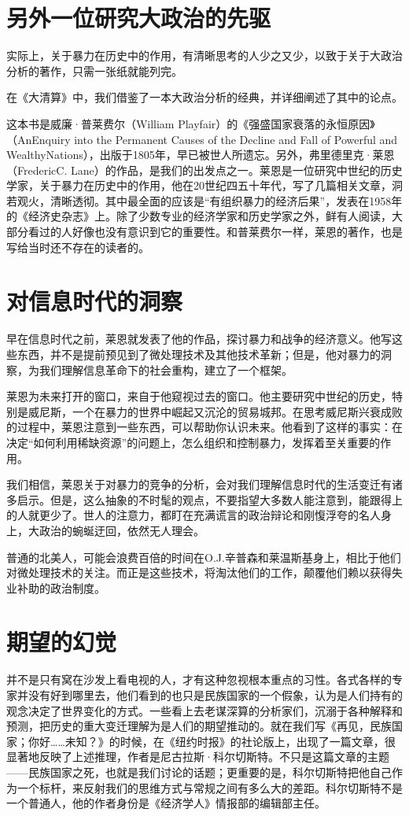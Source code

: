 \section{另外一位研究大政治的先驱}
实际上，关于暴力在历史中的作用，有清晰思考的人少之又少，以致于关于大政治分析的著作，只需一张纸就能列完。


在《大清算》中，我们借鉴了一本大政治分析的经典，并详细阐述了其中的论点。


这本书是威廉·普莱费尔（William Playfair）的《强盛国家衰落的永恒原因》（AnEnquiry into the Permanent Causes of the Decline and Fall of Powerful and WealthyNations），出版于1805年，早已被世人所遗忘。另外，弗里德里克·莱恩（FredericC. Lane）的作品，是我们的出发点之一。莱恩是一位研究中世纪的历史学家，关于暴力在历史中的作用，他在20世纪四五十年代，写了几篇相关文章，洞若观火，清晰透彻。其中最全面的应该是“有组织暴力的经济后果”，发表在1958年的《经济史杂志》上。除了少数专业的经济学家和历史学家之外，鲜有人阅读，大部分看过的人好像也没有意识到它的重要性。和普莱费尔一样，莱恩的著作，也是写给当时还不存在的读者的。


\section{对信息时代的洞察}
早在信息时代之前，莱恩就发表了他的作品，探讨暴力和战争的经济意义。他写这些东西，并不是提前预见到了微处理技术及其他技术革新；但是，他对暴力的洞察，为我们理解信息革命下的社会重构，建立了一个框架。


莱恩为未来打开的窗口，来自于他窥视过去的窗口。他主要研究中世纪的历史，特别是威尼斯，一个在暴力的世界中崛起又沉沦的贸易城邦。在思考威尼斯兴衰成败的过程中，莱恩注意到一些东西，可以帮助你认识未来。他看到了这样的事实：在决定“如何利用稀缺资源”的问题上，怎么组织和控制暴力，发挥着至关重要的作用。


我们相信，莱恩关于对暴力的竞争的分析，会对我们理解信息时代的生活变迁有诸多启示。但是，这么抽象的不时髦的观点，不要指望大多数人能注意到，能跟得上的人就更少了。世人的注意力，都盯在充满谎言的政治辩论和刚愎浮夸的名人身上，大政治的蜿蜒迂回，依然无人理会。


普通的北美人，可能会浪费百倍的时间在O.J.辛普森和莱温斯基身上，相比于他们对微处理技术的关注。而正是这些技术，将淘汰他们的工作，颠覆他们赖以获得失业补助的政治制度。


\section{期望的幻觉}
并不是只有窝在沙发上看电视的人，才有这种忽视根本重点的习性。各式各样的专家并没有好到哪里去，他们看到的也只是民族国家的一个假象，认为是人们持有的观念决定了世界变化的方式。一些看上去老谋深算的分析家们，沉溺于各种解释和预测，把历史的重大变迁理解为是人们的期望推动的。就在我们写《再见，民族国家；你好……未知？》的时候，在《纽约时报》的社论版上，出现了一篇文章，很显著地反映了上述推理，作者是尼古拉斯·科尔切斯特。不只是这篇文章的主题——民族国家之死，也就是我们讨论的话题；更重要的是，科尔切斯特把他自己作为一个标杆，来反射我们的思维方式与常规之间有多么大的差距。科尔切斯特不是一个普通人，他的作者身份是《经济学人》情报部的编辑部主任。


